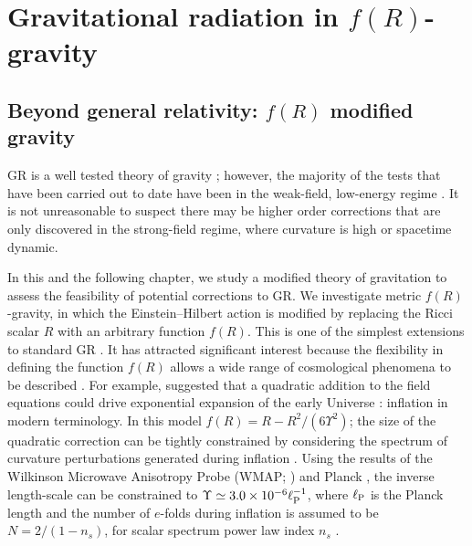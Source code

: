 \chapter{Gravitational radiation in $f(R)$-gravity}\label{ch:f-R1}

\section{Beyond general relativity: $f(R)$ modified gravity}

GR is a well tested theory of gravity \citep{Will2006}; however, the majority of the tests that have been carried out to date have been in the weak-field, low-energy regime \citep{Will1993,Psaltis2008a}. It is not unreasonable to suspect there may be higher order corrections that are only discovered in the strong-field regime, where curvature is high or spacetime dynamic.

In this and the following chapter, we study a modified theory of gravitation to assess the feasibility of potential corrections to GR. We investigate metric $f(R)$-gravity, in which the Einstein--Hilbert action is modified by replacing the Ricci scalar $R$ with an arbitrary function $f(R)$. This is one of the simplest extensions to standard GR \citep{Sotiriou2010, DeFelice2010}. It has attracted significant interest because the flexibility in defining the function $f(R)$ allows a wide range of cosmological phenomena to be described \citep{Nojiri2007, Capozziello2007a}. For example, \citet{Starobinsky1980} suggested that a quadratic addition to the field equations could drive exponential expansion of the early Universe \citep{Vilenkin1985}: inflation in modern terminology. In this model $f(R) = R - R^2/(6\Upsilon^2)$; the size of the quadratic correction can be tightly constrained by considering the spectrum of curvature perturbations generated during inflation \citep{Starobinskii1983, Starobinskii1985}. Using the results of the Wilkinson Microwave Anisotropy Probe (WMAP; \citealt{Bennett2012, Hinshaw2012}) and Planck \citep{Ade2013a,Ade2013b}, the inverse length-scale can be constrained to $\Upsilon \simeq 3.0 \times 10^{-6} \ell_\mathrm{P}^{-1}$, where $\ell_\mathrm{P}$ is the Planck length and the number of $e$-folds during inflation is assumed to be $N = 2/(1 - n_s)$, for scalar spectrum power law index $n_s$ \citep{Starobinsky2007, DeFelice2010}. %

